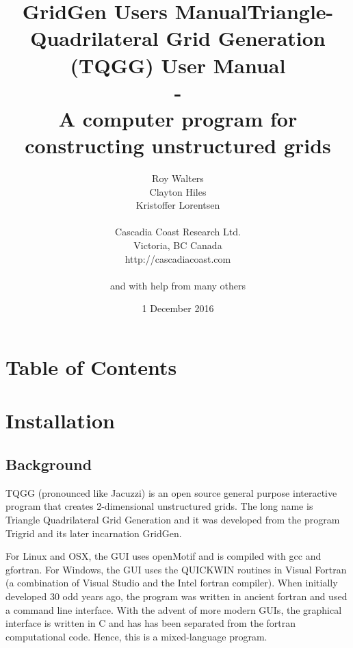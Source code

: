 \documentclass{article}
\title{GridGen Users Manual}
\begin{document}
\title{Triangle-Quadrilateral Grid Generation (TQGG) User Manual \\ - \\
 A computer program for constructing unstructured grids }

\author{Roy Walters \\
  Clayton Hiles \\
  Kristoffer Lorentsen \\ \\
  Cascadia Coast Research Ltd. \\
  Victoria, BC Canada \\
  http://cascadiacoast.com \\ \\
  and with help from many others \\}

\date{ 1 December 2016}

\maketitle

\newpage
\section*{Table of Contents}

\setcounter{tocdepth}{2}
\tableofcontents


\newpage
\section{Installation}

\subsection{Background}
TQGG (pronounced like Jacuzzi) is an open source general purpose interactive program that creates
2-dimensional unstructured grids. The long name is Triangle Quadrilateral Grid Generation and it was
developed from the program Trigrid and its later incarnation GridGen.

For Linux and OSX, the GUI uses openMotif and is compiled with gcc and gfortran. 
For Windows, the GUI uses the QUICKWIN routines in Visual Fortran (a combination of
Visual Studio and the Intel fortran compiler). When initially developed 30 odd years 
ago, the program was written in ancient fortran and used a command line interface. With
the advent of more modern GUIs, the graphical interface is written in C and has has 
been separated from the fortran computational code. Hence, this is a mixed-language program.
\end{document}
